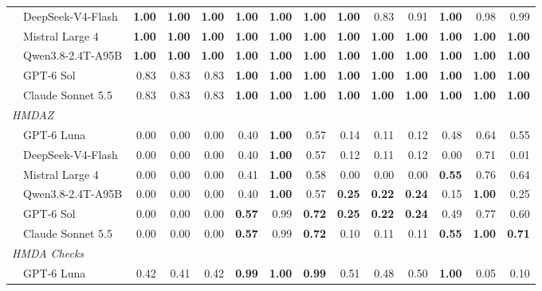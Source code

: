 \begin{table}[t]
\begin{tabular}{l@{\hspace{0.6em}}rrr@{\hspace{0.6em}}rrr@{\hspace{0.6em}}rrr@{\hspace{0.6em}}rrr}
  ~~DeepSeek-V4-Flash & \textbf{1.00} & \textbf{1.00} & \textbf{1.00} & \textbf{1.00} & \textbf{1.00} & \textbf{1.00} & \textbf{1.00} & 0.83 & 0.91 & \textbf{1.00} & 0.98 & 0.99 \\
  ~~Mistral Large 4 & \textbf{1.00} & \textbf{1.00} & \textbf{1.00} & \textbf{1.00} & \textbf{1.00} & \textbf{1.00} & \textbf{1.00} & \textbf{1.00} & \textbf{1.00} & \textbf{1.00} & \textbf{1.00} & \textbf{1.00} \\
  ~~Qwen3.8-2.4T-A95B & \textbf{1.00} & \textbf{1.00} & \textbf{1.00} & \textbf{1.00} & \textbf{1.00} & \textbf{1.00} & \textbf{1.00} & \textbf{1.00} & \textbf{1.00} & \textbf{1.00} & \textbf{1.00} & \textbf{1.00} \\
  ~~GPT-6 Sol & 0.83 & 0.83 & 0.83 & \textbf{1.00} & \textbf{1.00} & \textbf{1.00} & \textbf{1.00} & \textbf{1.00} & \textbf{1.00} & \textbf{1.00} & \textbf{1.00} & \textbf{1.00} \\
  ~~Claude Sonnet 5.5 & 0.83 & 0.83 & 0.83 & \textbf{1.00} & \textbf{1.00} & \textbf{1.00} & \textbf{1.00} & \textbf{1.00} & \textbf{1.00} & \textbf{1.00} & \textbf{1.00} & \textbf{1.00} \\
  \midrule
  \multicolumn{13}{l}{\textit{HMDAZ}} \\
  ~~GPT-6 Luna & 0.00 & 0.00 & 0.00 & 0.40 & \textbf{1.00} & 0.57 & 0.14 & 0.11 & 0.12 & 0.48 & 0.64 & 0.55 \\
  ~~DeepSeek-V4-Flash & 0.00 & 0.00 & 0.00 & 0.40 & \textbf{1.00} & 0.57 & 0.12 & 0.11 & 0.12 & 0.00 & 0.71 & 0.01 \\
  ~~Mistral Large 4 & 0.00 & 0.00 & 0.00 & 0.41 & \textbf{1.00} & 0.58 & 0.00 & 0.00 & 0.00 & \textbf{0.55} & 0.76 & 0.64 \\
  ~~Qwen3.8-2.4T-A95B & 0.00 & 0.00 & 0.00 & 0.40 & \textbf{1.00} & 0.57 & \textbf{0.25} & \textbf{0.22} & \textbf{0.24} & 0.15 & \textbf{1.00} & 0.25 \\
  ~~GPT-6 Sol & 0.00 & 0.00 & 0.00 & \textbf{0.57} & 0.99 & \textbf{0.72} & \textbf{0.25} & \textbf{0.22} & \textbf{0.24} & 0.49 & 0.77 & 0.60 \\
  ~~Claude Sonnet 5.5 & 0.00 & 0.00 & 0.00 & \textbf{0.57} & 0.99 & \textbf{0.72} & 0.10 & 0.11 & 0.11 & \textbf{0.55} & \textbf{1.00} & \textbf{0.71} \\
  \midrule
  \multicolumn{13}{l}{\textit{HMDA Checks}} \\
  ~~GPT-6 Luna & 0.42 & 0.41 & 0.42 & \textbf{0.99} & \textbf{1.00} & \textbf{0.99} & 0.51 & 0.48 & 0.50 & \textbf{1.00} & 0.05 & 0.10 \\

\end{tabular}
\end{table}
